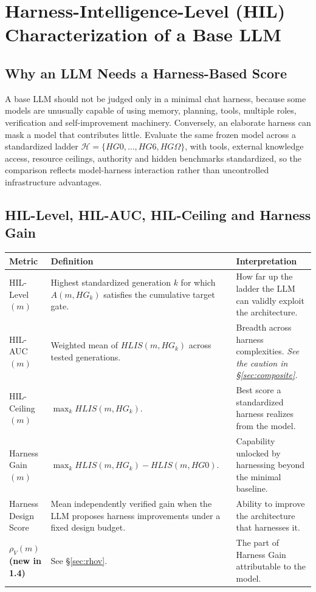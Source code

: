 \documentclass[11pt]{article}
\theoremstyle{definition}
\newcommand{\Om}{\ensuremath{\Omega}}
\newcommand{\rhov}{\ensuremath{\rho_V}}
\begin{document}
\section{Harness-Intelligence-Level (HIL) Characterization of a Base LLM}

\subsection{Why an LLM Needs a Harness-Based Score}

A base LLM should not be judged only in a minimal chat harness, because some models are unusually capable of using memory, planning, tools, multiple roles, verification and self-improvement machinery. Conversely, an elaborate harness can mask a model that contributes little. Evaluate the same frozen model across a standardized ladder $\mathcal{H} = \{HG0, \ldots, HG6, HG\Om{}\}$, with tools, external knowledge access, resource ceilings, authority and hidden benchmarks standardized, so the comparison reflects model-harness interaction rather than uncontrolled infrastructure advantages.

\subsection{HIL-Level, HIL-AUC, HIL-Ceiling and Harness Gain}

\begin{table}[h]
\centering\small
\begin{tabularx}{\textwidth}{@{}lYY@{}}
\toprule
Metric & Definition & Interpretation \\
\midrule
HIL-Level$(m)$ & Highest standardized generation $k$ for which $A(m,HG_k)$ satisfies the cumulative target gate. & How far up the ladder the LLM can validly exploit the architecture. \\
HIL-AUC$(m)$ & Weighted mean of $HLIS(m,HG_k)$ across tested generations. & Breadth across harness complexities. \emph{See the caution in \S\ref{sec:composite}.} \\
HIL-Ceiling$(m)$ & $\max_k HLIS(m,HG_k)$. & Best score a standardized harness realizes from the model. \\
Harness Gain$(m)$ & $\max_k HLIS(m,HG_k) - HLIS(m,HG0)$. & Capability unlocked by harnessing beyond the minimal baseline. \\
Harness Design Score & Mean independently verified gain when the LLM proposes harness improvements under a fixed design budget. & Ability to improve the architecture that harnesses it. \\
\textbf{$\rhov{}(m)$ (new in 1.4)} & See \S\ref{sec:rhov}. & The part of Harness Gain attributable to the model. \\
\bottomrule
\end{tabularx}
\end{table}
\end{document}
